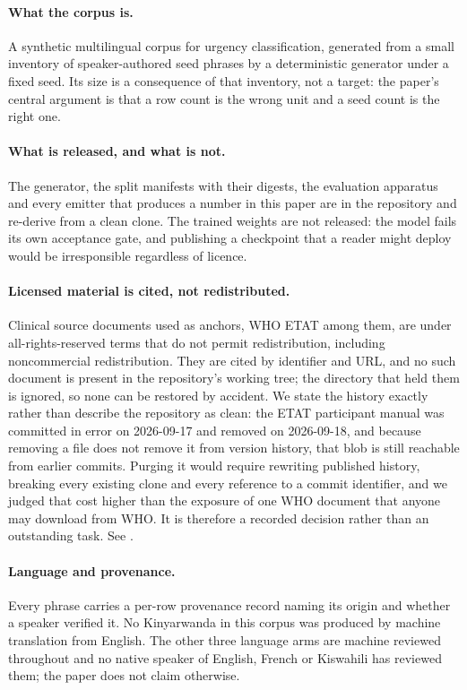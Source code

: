 \paragraph{What the corpus is.} A synthetic multilingual corpus for urgency
classification, generated from a small inventory of speaker-authored seed
phrases by a deterministic generator under a fixed seed. Its size is a
consequence of that inventory, not a target: the paper's central argument is
that a row count is the wrong unit and a seed count is the right one.

\paragraph{What is released, and what is not.} The generator, the split
manifests with their digests, the evaluation apparatus and every emitter that
produces a number in this paper are in the repository and re-derive from a clean
clone. The trained weights are not released: the model fails its own acceptance
gate, and publishing a checkpoint that a reader might deploy would be
irresponsible regardless of licence.

\paragraph{Licensed material is cited, not redistributed.} Clinical source
documents used as anchors, WHO ETAT among them, are under all-rights-reserved
terms that do not permit redistribution, including noncommercial redistribution.
They are cited by identifier and URL, and no such document is present in the
repository's working tree; the directory that held them is ignored, so none can
be restored by accident. We state the history exactly rather than describe the
repository as clean: the ETAT participant manual was committed in error on
2026-09-17 and removed on 2026-09-18, and because removing a file does not
remove it from version history, that blob is still reachable from earlier
commits. Purging it would require rewriting published history, breaking every
existing clone and every reference to a commit identifier, and we judged that
cost higher than the exposure of one WHO document that anyone may download from
WHO. It is therefore a recorded decision rather than an outstanding task. See
.

\paragraph{Language and provenance.} Every phrase carries a per-row provenance
record naming its origin and whether a speaker verified it. No Kinyarwanda in
this corpus was produced by machine translation from English. The other three
language arms are machine reviewed throughout and no native speaker of
English, French or Kiswahili has reviewed them; the paper does not claim
otherwise.
